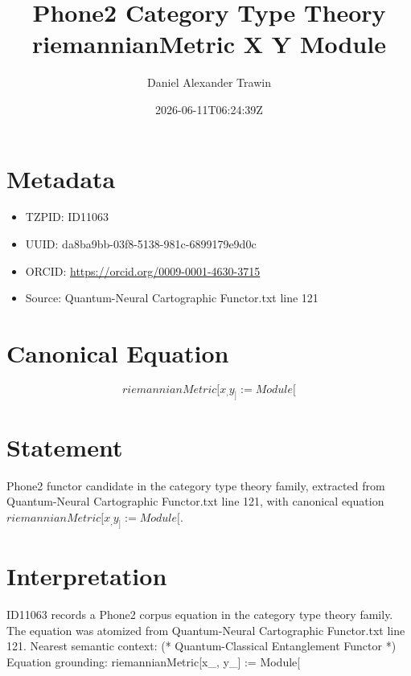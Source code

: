 \documentclass[11pt]{article}
\title{Phone2 Category Type Theory riemannianMetric X Y Module}
\author{Daniel Alexander Trawin}
\date{2026-06-11T06:24:39Z}
\begin{document}
\maketitle
\section*{Metadata}
\begin{itemize}
\item TZPID: ID11063
\item UUID: da8ba9bb-03f8-5138-981c-6899179e9d0c
\item ORCID: \url{https://orcid.org/0009-0001-4630-3715}
\item Source: Quantum-Neural Cartographic Functor.txt line 121
\end{itemize}
\section*{Canonical Equation}
\[
riemannianMetric[x_, y_] := Module[
\]
\section*{Statement}
Phone2 functor candidate in the category type theory family, extracted from Quantum-Neural Cartographic Functor.txt line 121, with canonical equation $riemannianMetric[x_, y_] := Module[$.
\section*{Interpretation}
ID11063 records a Phone2 corpus equation in the category type theory family. The equation was atomized from Quantum-Neural Cartographic Functor.txt line 121. Nearest semantic context: (* Quantum-Classical Entanglement Functor *) Equation grounding: riemannianMetric[x_, y_] := Module[
\end{document}

